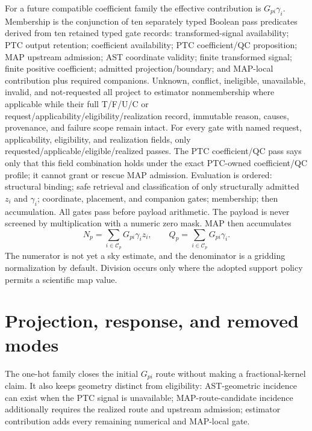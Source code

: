 \documentclass[10pt]{article}
\begin{document}
For a future compatible coefficient family the effective contribution is
\(G_{pi}\gamma_i\). Membership is the conjunction of ten separately typed
Boolean pass predicates derived from ten retained typed gate records:
transformed-signal availability; PTC output retention; coefficient
availability; PTC coefficient/QC proposition; MAP upstream admission; AST
coordinate validity; finite transformed signal; finite positive coefficient;
admitted projection/boundary; and MAP-local contribution plus required
companions. Unknown, conflict, ineligible, unavailable, invalid, and
not-requested all project to estimator nonmembership where applicable while
their full T/F/U/C or request/applicability/eligibility/realization record,
immutable reason, causes, provenance, and failure scope remain intact. For
every gate with named request, applicability, eligibility, and realization
fields, only requested/applicable/eligible/realized passes. The PTC
coefficient/QC pass says only that this field combination holds under the exact
PTC-owned coefficient/QC profile; it cannot grant or rescue MAP admission.
Evaluation is ordered: structural binding; safe retrieval and classification
of only structurally admitted \(z_i\) and \(\gamma_i\); coordinate, placement,
and companion gates; membership; then accumulation. All gates pass before
payload arithmetic. The payload is never screened by multiplication with a
numeric zero mask. MAP then accumulates
\begin{equation}
 N_p=\sum_{i\in\mathcal C_p}G_{pi}\gamma_i z_i,\qquad
 Q_p=\sum_{i\in\mathcal C_p}G_{pi}\gamma_i.
\end{equation}
The numerator is not yet a sky estimate, and the denominator is a gridding
normalization by default. Division occurs only where the adopted support
policy permits a scientific map value.

\section{Projection, response, and removed modes}\label{sec:projection}
The one-hot family closes the initial \(G_{pi}\) route without making a
fractional-kernel claim. It also keeps geometry distinct from eligibility:
AST-geometric incidence can exist when the PTC signal is unavailable;
MAP-route-candidate incidence additionally requires the realized route and
upstream admission; estimator contribution adds every remaining numerical and
MAP-local gate.
\end{document}
